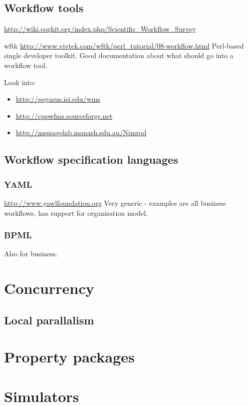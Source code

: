 \subsection{Workflow tools}

\url{http://wiki.cogkit.org/index.php/Scientific_Workflow_Survey}

wftk \url{http://www.vivtek.com/wftk/perl_tutorial/08-workflow.html}
Perl-based single developer toolkit.  Good documentation about what
should go into a workflow tool.

Look into:
\begin{itemize}
\item \url{http://pegasus.isi.edu/wms}
\item \url{http://cppwfms.sourceforge.net}
\item \url{http://messagelab.monash.edu.au/Nimrod}
\end{itemize}

\subsection{Workflow specification languages}

\subsubsection{YAML}
\url{http://www.yawlfoundation.org} Very generic - examples are all
business workflows, has support for organisation model.  

\subsubsection{BPML}
Also for business.

\section{Concurrency}
\subsection{Local parallalism}

\section{Property packages}


\section{Simulators}
